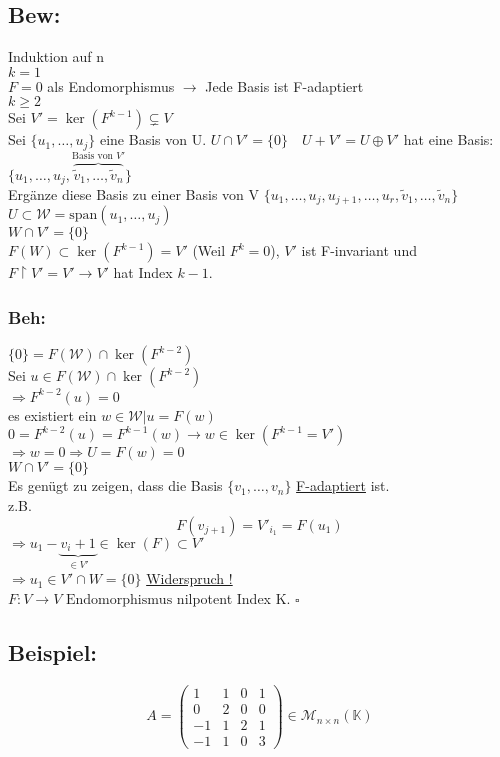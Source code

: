 \documentclass[titlepage,12pt,a4paper,ngerman]{report}
\newenvironment{bew}[1]{\subsection{Bew: #1}}{\hfill$\square$}
\newcommand{\Bew}[2]{\begin{bew}{#1}#2\end{bew}}
\newcommand{\tx}[1]{\textrm{#1}}
\newcommand{\ub}[1]{\underbrace{#1}}
\newcommand{\ob}[1]{\overbrace{#1}}
\newcommand{\spa}{\tx{span}}
\newcommand{\enph}{F: V \to V \textrm{ Endomorphismus}}
\begin{document}
\Bew{}{
Induktion auf n\\
$ \boxed{k=1} $\\
$ F = 0 $ als Endomorphismus $ \rightarrow $ Jede Basis ist F-adaptiert\\
$ \boxed{k\ge 2} $\\
Sei $ V' = \ker(F^{k-1}) \subsetneq V $\\
Sei $ \{u_1,\dots , u_j\} $ eine Basis von U.
$U \cap V' = \{0\} \quad U + V' = U \oplus V'$
hat eine Basis: $ \{u_1,\dots,u_j,\ob{\tilde{v}_1, \dots, \tilde{v}_n }^{\tx{Basis von } V'}\} $\\
Ergänze diese Basis zu einer Basis von V $ \{u_1,\dots,u_j,u_{j+1},\dots,u_r,\tilde{v}_1 , \dots , \tilde{v}_n\} $\\
$U \subset \mathcal{W} = \spa(u_1,\dots,u_j)$\\
$ W \cap V' = \{0\} $\\
$ F(W) \subset \ker(F^{k-1}) = V' $ (Weil $ F^k = 0 $), $V'$ ist F-invariant und\\
$ F \upharpoonright V' = V' \to V' $ hat Index \underline{\underline{$ k-1 $}}.
\subsubsection{Beh:}
$ \{0\} = F(\mathcal{W}) \cap \ker(F^{k-2}) $\\
Sei $ u \in F(\mathcal{W}) \cap \ker(F^{k-2}) $\\
$ \Rightarrow F^{k-2}(u) = 0 $\\
es existiert ein $ w \in \mathcal{W} | u = F(w) $\\
$ 0 = F^{k-2}(u) = F^{k-1} (w)  \rightarrow w \in \ker(F^{k-1} = V')$\\
$ \Rightarrow w = 0 \Rightarrow U = F(w) = 0 $\\
$ W \cap V' = \{0\} $\\


Es genügt zu zeigen, dass die Basis $ \{v_1,\dots,v_n\} $ \underline{F-adaptiert} ist.\\
z.B. $$F(v_{j+1})  = V'_{i_1} = F(u_1)$$
$ \Rightarrow u_1 - \ub{v_i +1}_{\in V'} \in \ker(F) \subset V' $\\
$ \Rightarrow u_1 \in V' \cap W = \{0\} $ \underline{Widerspruch !}\\[5pt]
$ \enph $ nilpotent Index K.
\pagebreak
}
\subsection*{Beispiel:}
$$A = \begin{pmatrix}
1 &1&0&1\\0&2&0&0\\-1&1&2&1\\-1&1&0&3
\end{pmatrix} \in \mathcal{M}_{n\times n} (\mathbb{K})$$
\end{document}
